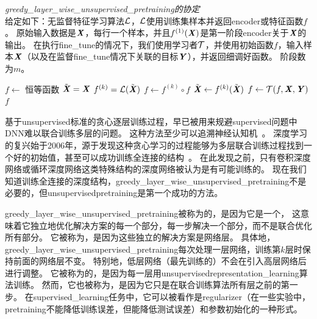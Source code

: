 \begin{algorithm}
\caption{ {\em \gls{greedy_layer_wise_unsupervised_pretraining}的协定}\\
给定如下：无监督特征学习算法$\mathcal{L}$，$\mathcal{L}$使用训练集样本并返回\gls{encoder}或特征函数$f$。
原始输入数据是$\boldsymbol{\mathit{X}}$，每行一个样本，并且$f^{(1)}(\boldsymbol{\mathit{X}})$是第一阶段\gls{encoder}关于$\boldsymbol{\mathit{X}}$的输出。
在执行\gls{fine_tune}的情况下，我们使用学习者$\mathcal{T}$，并使用初始函数$f$，输入样本$\boldsymbol{\mathit{X}}$（以及在监督\gls{fine_tune}情况下关联的目标$\boldsymbol{\mathit{Y}}$），并返回细调好函数。 阶段数为$m$。
}
\label{alg:pretraining}
\begin{algorithmic}
\STATE $f \leftarrow$ 恒等函数
\STATE $\tilde{\boldsymbol{\mathit{X}}} = \boldsymbol{\mathit{X}}$
  \STATE $f^{(k)} = {\mathcal{L}}(\tilde{\boldsymbol{\mathit{X}}})$
  \STATE $f \leftarrow f^{(k)} \circ f$
  \STATE $\tilde{\boldsymbol{\mathit{X}}} \leftarrow f^{(k)}(\tilde{\boldsymbol{\mathit{X}}})$
\ENDFOR
{}
  \STATE $f \leftarrow {\mathcal{T}}(f,\boldsymbol{\mathit{X}},\boldsymbol{\mathit{Y}})$
\ENDIF
{} $f$
\end{algorithmic}
\end{algorithm}


基于\gls{unsupervised}标准的贪心逐层训练过程，早已被用来规避\gls{supervised}问题中\gls{DNN}难以联合训练多层的问题。
这种方法至少可以追溯神经认知机~\citep{Fukushima75}。
深度学习的复兴始于2006年，源于发现这种贪心学习的过程能够为多层联合训练过程找到一个好的初始值，甚至可以成功训练全连接的结构~\citep{Hinton06-small,Hinton-Science2006,HintonG2006,Bengio-nips-2006,ranzato-07-small}。
在此发现之前，只有卷积深度网络或循环深度网络这类特殊结构的深度网络被认为是有可能训练的。%
现在我们知道训练全连接的深度结构，\gls{greedy_layer_wise_unsupervised_pretraining}不是必要的，但\gls{unsupervised}\gls{pretraining}是第一个成功的方法。


\gls{greedy_layer_wise_unsupervised_pretraining}被称为的，是因为它是一个，
这意味着它独立地优化解决方案的每一个部分，每一步解决一个部分，而不是联合优化所有部分。
它被称为，是因为这些独立的解决方案是网络层。
具体地，\gls{greedy_layer_wise_unsupervised_pretraining}每次处理一层网络，训练第$k$层时保持前面的网络层不变。
特别地，低层网络（最先训练的）不会在引入高层网络后进行调整。
它被称为的，是因为每一层用\gls{unsupervised}\gls{representation_learning}算法训练。
然而，它也被称为，是因为它只是在联合训练算法所有层之前的第一步。
在\gls{supervised_learning}任务中，它可以被看作是\gls{regularizer}（在一些实验中，\gls{pretraining}不能降低训练误差，但能降低测试误差）和参数初始化的一种形式。



